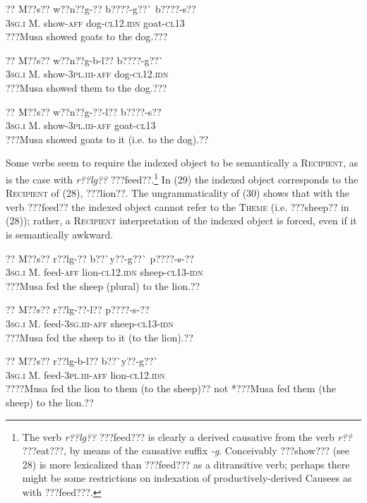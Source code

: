 \documentclass[output=paper]{langsci/langscibook}
\begin{document}
\ea \gll 
\label{bkm:Ref424217838}??    M??s??  w??n??g-??  b????-g??\`{ }    b????-s??
\\
%
\textsc{3sg.i  }  M.  show-\textsc{aff}  dog-\textsc{cl12.idn}  goat-\textsc{cl13}
\\\glt
???Musa showed goats to the dog.???
\z


\ea \gll 
??    M??s??  w??n??g-b-l??    b????-g??\`{ }
\\
%
\textsc{3sg.i    }M.  show-\textsc{3pl.iii-aff}  dog-\textsc{cl12.idn}
\\\glt
???Musa showed them to the dog.???  
\z


\ea \gll 
\label{bkm:Ref424317424}??    M??s??  w??n??g-??-l??    b????-s??
\\
%
\textsc{3sg.i  }  M.  show-\textsc{3pl.iii-aff}  goat-\textsc{cl13}
\\\glt
???Musa showed goats to it (i.e. to the dog).??
\z

Some verbs seem to require the indexed object to be semantically a \textsc{Recipient}, as is the case with \textit{r??lg??} ???feed??.\footnote{ The verb \textit{r??lg??} ???feed??? is clearly a derived causative from the verb \textit{r??} ???eat???, by means of the causative suffix \textit{{}-g}. Conceivably ???show??? (see 28) is more lexicalized than ???feed??? as a ditransitive verb; perhaps there might be some restrictions on indexation of productively-derived Causees as with ???feed???.}{ }In (29) the indexed object corresponds to the \textsc{Recipient} of (28), ???lion??. The ungrammaticality of (30) shows that with the verb ???feed?? the indexed object cannot refer to the \textsc{Theme} (i.e. ???sheep?? in (28)); rather, a \textsc{Recipient} interpretation of the indexed object is forced, even if it is semantically awkward.


\ea \gll 
\label{bkm:Ref424335625}??    M??s??  r??lg-??    b??\`{ }y??-g??\`{ }    p????-s-??
\\
%
\textsc{3sg.i  }  M.  feed-\textsc{aff}  lion-\textsc{cl12.idn}  sheep-\textsc{cl13-idn}
\\\glt
???Musa fed the sheep (plural) to the lion.??
\z


\ea \gll 
\label{bkm:Ref424317641}??    M??s??    r??lg-??-l??    p????-s-??
\\
%
\textsc{3sg.i  }  M.    feed-\textsc{3sg.iii-aff}  sheep-\textsc{cl13-idn}
\\\glt
???Musa fed the sheep to it (to the lion).??
\z


\ea \gll 
\label{bkm:Ref424317670}??    M??s??  r??lg-b-l??      b??\`{ }y??-g??\`{ }
\\
%
\textsc{3sg.i  }  M.  feed-\textsc{3pl.iii-aff  }  lion-\textsc{cl12.idn}
\\\glt
????Musa fed the lion to them (to the sheep)?? not *???Musa fed them (the sheep) to the lion.??  
\z
\end{document}
